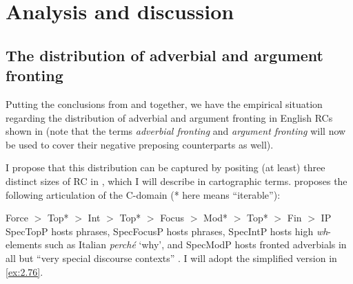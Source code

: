 \documentclass[output=paper]{langsci/langscibook}
\begin{document}
\section{Analysis and discussion}\label{sec:02.4}

\subsection{The distribution of adverbial and argument fronting}

Putting the conclusions from  and  together, we have the empirical
situation regarding the distribution of adverbial and argument
fronting in
English \glspl{RC} shown in  (note that the terms \emph{adverbial
fronting} and \emph{argument fronting} will now be used to cover their negative
preposing counterparts as well).

\begin{table}
\caption{Distribution of adverbial and argument fronting in full clausal \glspl{RC} in . ✔: allowed; (✔): allowed subject to restrictions; *: not allowed.\label{tab:2}}
\end{table}

I propose that this distribution can be captured by positing (at least) three
distinct sizes of \gls{RC} in , which I will
describe in cartographic terms.  \textcite[242]{Rizzi2004} proposes the
following articulation of the C-domain (* here means \enquote{iterable}):

\ea\label{ex:2.75}
    Force $>$ Top* $>$ Int $>$ Top* $>$ Focus $>$ Mod* $>$ Top* $>$ Fin $>$ IP
\z
SpecTopP hosts  phrases, SpecFocusP hosts  phrases, SpecIntP hosts
high \emph{wh}{-elements such as Italian} \emph{perché} ‘why’, and SpecModP
hosts fronted adverbials in all but \enquote{very special discourse contexts}
\parencite{Rizzi2004}. I will adopt the simplified version in \eqref{ex:2.76}.
\end{document}

